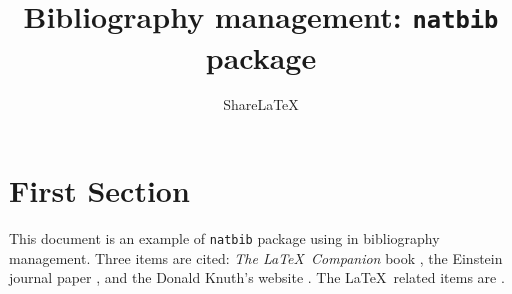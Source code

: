 \documentclass{article}
\title{Bibliography management: \texttt{natbib} package}
\author{Share\LaTeX}
\date { }
\begin{document}
\maketitle

\tableofcontents

\section{First Section}
This document is an example of \texttt{natbib} package using in bibliography management. Three items are cited: \textit{The \LaTeX\ Companion} book \cite{latexcompanion}, the Einstein journal paper \citet{einstein}, and the Donald Knuth's website \cite{knuthwebsite}. The \LaTeX\ related items are \cite{latexcompanion,knuthwebsite}. 

\medskip


\end{document}
